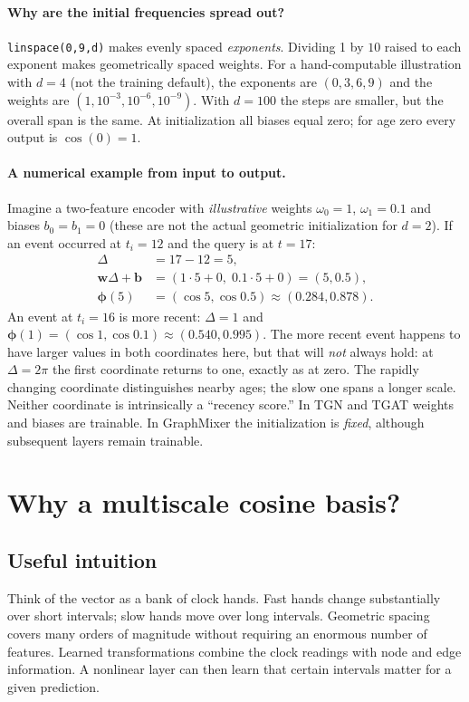 \documentclass[11pt]{article}
\begin{document}
\paragraph{Why are the initial frequencies spread out?}
\texttt{linspace(0,9,d)} makes evenly spaced \emph{exponents}. Dividing 1 by $10$ raised to each exponent makes geometrically spaced weights. For a hand-computable illustration with $d=4$ (not the training default), the exponents are $(0,3,6,9)$ and the weights are $(1,10^{-3},10^{-6},10^{-9})$. With $d=100$ the steps are smaller, but the overall span is the same. At initialization all biases equal zero; for age zero every output is $\cos(0)=1$.

\paragraph{A numerical example from input to output.}
Imagine a two-feature encoder with \emph{illustrative} weights $\omega_0=1$, $\omega_1=0.1$ and biases $b_0=b_1=0$ (these are not the actual geometric initialization for $d=2$). If an event occurred at $t_i=12$ and the query is at $t=17$:
\begin{align}
\Delta&=17-12=5,\\
\mathbf{w}\Delta+\mathbf{b}&=(1\cdot5+0,\;0.1\cdot5+0)=(5,0.5),\\
\boldsymbol{\phi}(5)&=(\cos5,\cos0.5)\approx(0.284,0.878).
\end{align}
An event at $t_i=16$ is more recent: $\Delta=1$ and $\boldsymbol{\phi}(1)=(\cos1,\cos0.1)\approx(0.540,0.995)$. The more recent event happens to have larger values in both coordinates here, but that will \emph{not} always hold: at $\Delta=2\pi$ the first coordinate returns to one, exactly as at zero. The rapidly changing coordinate distinguishes nearby ages; the slow one spans a longer scale. Neither coordinate is intrinsically a ``recency score.'' In TGN and TGAT weights and biases are trainable. In GraphMixer the initialization is \emph{fixed}, although subsequent layers remain trainable.

\section{Why a multiscale cosine basis?}
\subsection{Useful intuition}
Think of the vector as a bank of clock hands. Fast hands change substantially over short intervals; slow hands move over long intervals. Geometric spacing covers many orders of magnitude without requiring an enormous number of features. Learned transformations combine the clock readings with node and edge information. A nonlinear layer can then learn that certain intervals matter for a given prediction.
\end{document}

